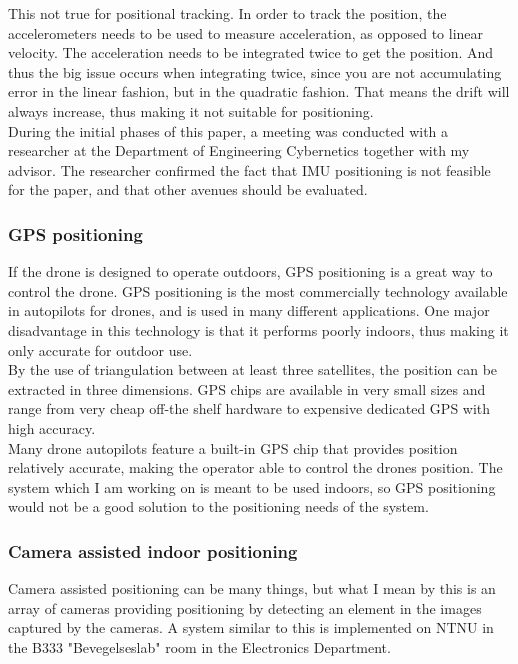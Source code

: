 This not true for positional tracking. In order to track the position, the accelerometers needs to be used to measure acceleration, as opposed to linear velocity. The acceleration needs to be integrated twice to get the position. And thus the big issue occurs when integrating twice, since you are not accumulating error in the linear fashion, but in the quadratic fashion. That means the drift will always increase, thus making it not suitable for positioning.\cite{robot}\\

During the initial phases of this paper, a meeting was conducted with a researcher at the  Department of Engineering Cybernetics together with my advisor. The researcher confirmed the fact that IMU positioning is not feasible for the paper, and that other avenues should be evaluated.

\subsubsection{GPS positioning}
If the drone is designed to operate outdoors, GPS positioning is a great way to control the drone. GPS positioning is the most commercially technology available in autopilots for drones, and is used in many different applications. One major disadvantage in this technology is that it performs poorly indoors, thus making it only accurate for outdoor use.\\

By the use of triangulation between at least three satellites, the position can be extracted in three dimensions. GPS chips are available in very small sizes and range from very cheap off-the shelf hardware to expensive dedicated GPS with high accuracy.\\

Many drone autopilots feature a built-in GPS chip that provides position relatively accurate, making the operator able to control the drones position. The system which I am working on is meant to be used indoors, so GPS positioning would not be a good solution to the positioning needs of the system.

\subsubsection{Camera assisted indoor positioning}
Camera assisted positioning can be many things, but what I mean by this is an array of cameras providing positioning by detecting an element in the images captured by the cameras. A system similar to this is implemented on NTNU in the B333 "Bevegelseslab" room in the Electronics Department.\\

